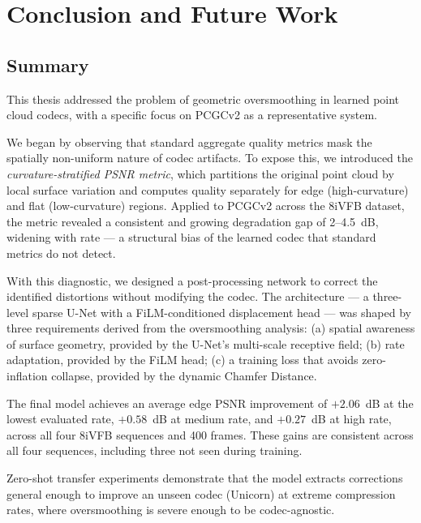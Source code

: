 \chapter{Conclusion and Future Work}
\label{ch:conclusion}

\section{Summary}

This thesis addressed the problem of geometric oversmoothing in learned
point cloud codecs, with a specific focus on PCGCv2 as a representative system.

We began by observing that standard aggregate quality metrics mask the
spatially non-uniform nature of codec artifacts.
To expose this, we introduced the \emph{curvature-stratified PSNR metric},
which partitions the original point cloud by local surface variation and
computes quality separately for edge (high-curvature) and flat (low-curvature)
regions.
Applied to PCGCv2 across the 8iVFB dataset, the metric revealed a consistent
and growing degradation gap of 2--4.5~dB, widening with rate --- a structural
bias of the learned codec that standard metrics do not detect.

With this diagnostic, we designed a post-processing network to correct the
identified distortions without modifying the codec.
The architecture --- a three-level sparse U-Net with a FiLM-conditioned
displacement head --- was shaped by three requirements derived from the
oversmoothing analysis:
(a) spatial awareness of surface geometry, provided by the U-Net's
multi-scale receptive field;
(b) rate adaptation, provided by the FiLM head;
(c) a training loss that avoids zero-inflation collapse, provided by the
dynamic Chamfer Distance.

The final model achieves an average edge PSNR improvement of
$\mathbf{+2.06}$~dB at the lowest evaluated rate,
$\mathbf{+0.58}$~dB at medium rate, and
$\mathbf{+0.27}$~dB at high rate,
across all four 8iVFB sequences and 400 frames.
These gains are consistent across all four sequences, including three not
seen during training.

Zero-shot transfer experiments demonstrate that the model extracts
corrections general enough to improve an unseen codec (Unicorn) at extreme
compression rates, where oversmoothing is severe enough to be codec-agnostic.


